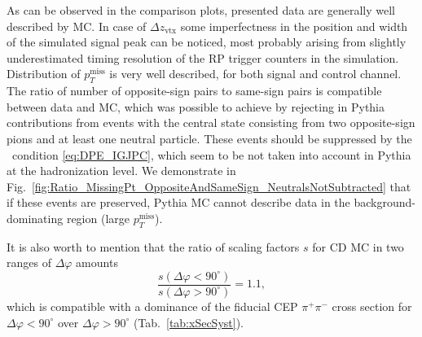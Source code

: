 As can be observed in the comparison plots, presented data are generally well described by MC. In case of $\Delta z_{\text{vtx}}$ some imperfectness in the position and width of the simulated signal peak can be noticed, most probably arising from slightly underestimated timing resolution of the RP trigger counters in the simulation. Distribution of $p_{T}^{\text{miss}}$ is very well described, for both signal and control channel. The ratio of number of opposite-sign pairs to same-sign pairs is compatible between data and MC, which was possible to achieve by rejecting in Pythia contributions from events with the central state consisting from two opposite-sign pions and at least one neutral particle. These events should be suppressed by the \DPE\ condition \eqref{eq:DPE_IGJPC}, which seem to be not taken into account in Pythia at the hadronization level. We demonstrate in Fig.~\ref{fig:Ratio_MissingPt_OppositeAndSameSign_NeutralsNotSubtracted} that if these events are preserved, Pythia MC cannot describe data in the background-dominating region (large $p_{T}^{\text{miss}}$).

It is also worth to mention that the ratio of scaling factors $s$ for CD MC in two ranges of $\Delta\varphi$ amounts%
\begin{equation}\label{eq:scalingCD}%
\frac{s(\Delta\varphi<90^{\circ})}{s(\Delta\varphi>90^{\circ})} = 1.1,  
\end{equation}
which is compatible with a dominance of the fiducial CEP $\pi^{+}\pi^{-}$ cross section for $\Delta\varphi<90^{\circ}$ over $\Delta\varphi>90^{\circ}$ (Tab.~\ref{tab:xSecSyst}).

